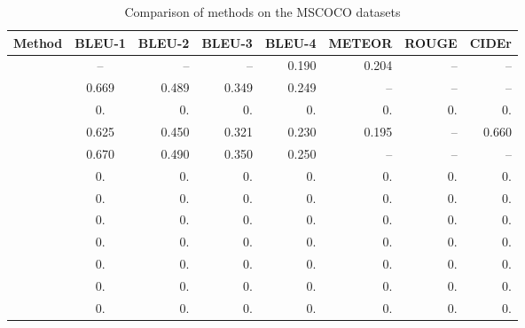 \begin{table}[ht]
\caption{Comparison of methods on the MSCOCO datasets}
\begin{tabular}{lcrrrrrr}
    \toprule
    Method &  BLEU-1 & BLEU-2 & BLEU-3 & BLEU-4 & METEOR & ROUGE & CIDEr\\
    \midrule
    \citet{Chen2015} & -- & -- & -- & 0.190 & 0.204 & -- & --\\
    \citet{Donahue2015} & 0.669 & 0.489 & 0.349 & 0.249 & -- & -- & --\\
    \citet{Fang2015} & 0. & 0. & 0. & 0. & 0. & 0. & 0.\\
    \citet{Karpathy2015} & 0.625 & 0.450 & 0.321 & 0.230 & 0.195 & -- & 0.660\\
    \citet{Mao2015_mRNN} & 0.670 & 0.490 & 0.350 & 0.250 & -- & -- & --\\
    \citet{} & 0. & 0. & 0. & 0. & 0. & 0. & 0.\\
    \citet{} & 0. & 0. & 0. & 0. & 0. & 0. & 0.\\
    \citet{} & 0. & 0. & 0. & 0. & 0. & 0. & 0.\\
    \citet{} & 0. & 0. & 0. & 0. & 0. & 0. & 0.\\
    \citet{} & 0. & 0. & 0. & 0. & 0. & 0. & 0.\\
    \citet{} & 0. & 0. & 0. & 0. & 0. & 0. & 0.\\
    \citet{} & 0. & 0. & 0. & 0. & 0. & 0. & 0.\\
    \bottomrule
\end{tabular}
\label{tab:benchmarks_mscoco}
\end{table}
